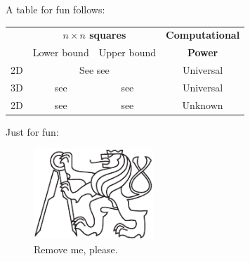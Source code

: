 

A table for fun follows:
\begin{center}
\begin{tabular}{|| c || c | c | c ||}
	\hline\hline
	~ & \multicolumn{2}{c|}{\bf $n\times n$ squares} & {\bf Computational} \\
	~ & \multicolumn{1}{c}{Lower bound} & \multicolumn{1}{c|}{Upper bound} & {\bf Power}\\
	\hline
	2D & \multicolumn{2}{c|}{See see} & Universal \\
	\hline
	3D & see & see & Universal \\
	\hline
	2D & see & see & Unknown \\
	\hline\hline
\end{tabular}
\end{center}

Just for fun:
\begin{figure}[H]
\begin{center}
	\includegraphics[width=0.4\textwidth]{./figures/fig.pdf} %
	\caption{Remove me, please.}
	\label{fig:3color}
\end{center}
\end{figure}


